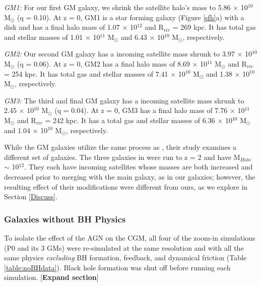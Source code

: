 \documentclass[]{emulateapj}
\begin{document}
\textit{GM1:} For our first GM galaxy, we shrink the satellite halo's mass to 5.86 $\times$ 10$^{10}$ M$_{\odot}$ (q = 0.10). At z = 0, GM1 is a star forming galaxy (Figure \ref{sfh}a) with a disk and has a final halo mass of 1.07 $\times$ 10$^{12}$ and R$_{vir}$ = 269 kpc. It has total gas and stellar masses of 1.01 $\times$ 10$^{11}$ M$_{\odot}$ and 6.43 $\times$ 10$^{10}$ M$_{\odot}$, respectively.

\textit{GM2:} Our second GM galaxy has a incoming satellite mass shrunk to 3.97 $\times$ 10$^{10}$ M$_{\odot}$ (q = 0.06). At z = 0, GM2 has a final halo mass of 8.69 $\times$ 10$^{11}$ M$_{\odot}$ and R$_{vir}$ = 254 kpc. It has total gas and stellar masses of 7.41 $\times$ 10$^{10}$ M$_{\odot}$ and 1.38 $\times$ 10$^{10}$ M$_{\odot}$, respectively.

\textit{GM3:} The third and final GM galaxy has a incoming satellite mass shrunk to 2.45 $\times$ 10$^{10}$ M$_{\odot}$ (q = 0.04). At z = 0, GM3 has a final halo mass of 7.76 $\times$ 10$^{11}$ M$_{\odot}$ and R$_{vir}$ = 242 kpc. It has a total gas and stellar masses of 6.36 $\times$ 10$^{10}$ M$_{\odot}$ and 1.04 $\times$ 10$^{10}$ M$_{\odot}$, respectively. 

While the GM galaxies utilize the same process as \cite{Pontzen2016}, their study examines a different set of galaxies. The three galaxies in \cite{Pontzen2016} were run to z = 2 and have M$_{Halo}$ $\sim$ 10$^{12}$. They each have incoming satellites whose masses are both increased and decreased prior to merging with the main galaxy, as in our galaxies; however, the resulting effect of their modifications were different from ours, as we explore in Section \ref{Discuss}.

\subsubsection{Galaxies without BH Physics}
To isolate the effect of the AGN on the CGM, all four of the zoom-in simulations (P0 and its 3 GMs) were re-simulated at the same resolution and with 
all the same physics \textit{excluding} BH formation, feedback, and dynamical friction (Table \ref{table:noBHdata}). Black hole formation was shut off before running each simulation. [\textbf{Expand section}]
\end{document}
